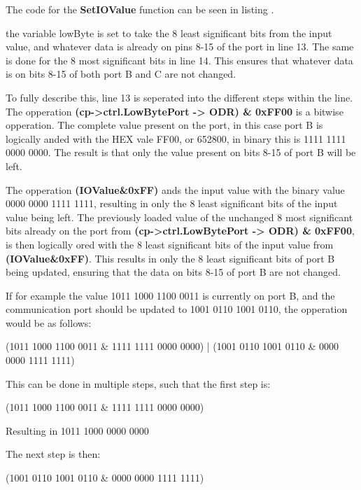 The code for the \textbf{SetIOValue} function can be seen in listing .



the variable lowByte is set to take the 8 least significant bits from the input value, and whatever data is already on pins 8-15 of the port in line 13. The same is done for the 8 most significant bits in line 14. This ensures that whatever data is on bits 8-15 of both port B and C are not changed.

To fully describe this, line 13 is seperated into the different steps within the line. The opperation \textbf{(cp->ctrl.LowBytePort -> ODR) \& 0xFF00} is a bitwise opperation. The complete value present on the port, in this case port B is logically anded with the HEX vale FF00, or 652800, in binary this is 1111 1111 0000 0000. The result is that only the value present on bits 8-15 of port B will be left. 

The opperation \textbf{(IOValue\&0xFF)} ands the input value with the binary value 0000 0000 1111 1111, resulting in only the 8 least significant bits of the input value being left. The previously loaded value of the unchanged 8 most significant bits already on the port from \textbf{(cp->ctrl.LowBytePort -> ODR) \& 0xFF00}, is then logically ored with the 8 least significant bits of the input value from \textbf{(IOValue\&0xFF)}. This results in only the 8 least significant bits of port B being updated, ensuring that the data on bits 8-15 of port B are not changed.

If for example the value 1011 1000 1100 0011 is currently on port B, and the communication port should be updated to 1001 0110 1001 0110, the opperation would be as follows:

(1011 1000 1100 0011 \& 1111 1111 0000 0000) | (1001 0110 1001 0110 \& 0000 0000 1111 1111)

This can be done in multiple steps, such that the first step is:

(1011 1000 1100 0011 \& 1111 1111 0000 0000)

Resulting in 1011 1000 0000 0000 

The next step is then: 

(1001 0110 1001 0110 \& 0000 0000 1111 1111) 

